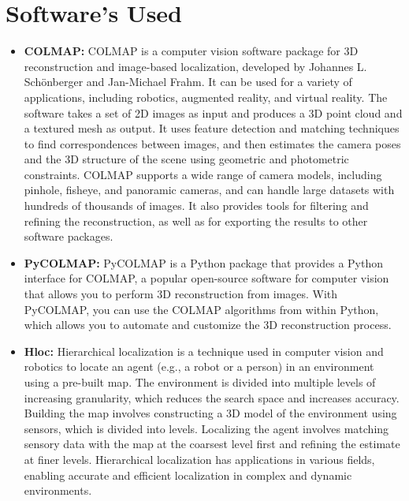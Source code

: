\documentclass[sigconf]{acmart}
\begin{document}
\section{Software's Used}
\begin{itemize}
\item{\textbf{COLMAP\cite{schoenberger2016sfm}: }
COLMAP is a computer vision software package for 3D reconstruction and image-based localization, developed by Johannes L. Schönberger and Jan-Michael Frahm. It can be used for a variety of applications, including robotics, augmented reality, and virtual reality. The software takes a set of 2D images as input and produces a 3D point cloud and a textured mesh as output. It uses feature detection and matching techniques to find correspondences between images, and then estimates the camera poses and the 3D structure of the scene using geometric and photometric constraints. COLMAP supports a wide range of camera models, including pinhole, fisheye, and panoramic cameras, and can handle large datasets with hundreds of thousands of images. It also provides tools for filtering and refining the reconstruction, as well as for exporting the results to other software packages.} 

\item{\textbf{PyCOLMAP: }
PyCOLMAP is a Python package that provides a Python interface for COLMAP, a popular open-source software for computer vision that allows you to perform 3D reconstruction from images. With PyCOLMAP, you can use the COLMAP algorithms from within Python, which allows you to automate and customize the 3D reconstruction process.}

\item{\textbf{Hloc\cite{hlocatlargescale}: }
Hierarchical localization is a technique used in computer vision and robotics to locate an agent (e.g., a robot or a person) in an environment using a pre-built map. The environment is divided into multiple levels of increasing granularity, which reduces the search space and increases accuracy. Building the map involves constructing a 3D model of the environment using sensors, which is divided into levels. Localizing the agent involves matching sensory data with the map at the coarsest level first and refining the estimate at finer levels. Hierarchical localization has applications in various fields, enabling accurate and efficient localization in complex and dynamic environments.}


\end{itemize}
\end{document}
